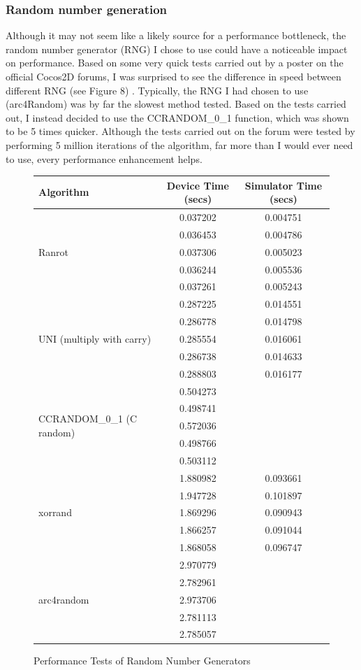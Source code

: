 \documentclass[a4paper,oneside]{report}
\begin{document}
\subsubsection{Random number generation} 

Although it may not seem like a likely source for a performance bottleneck, the random number generator (RNG) I chose to use could have a noticeable impact on performance. Based on some very quick tests carried out by a poster on the official Cocos2D forums, I was surprised to see the difference in speed between different RNG (see Figure 8) \cite{:2011zt}. Typically, the RNG I had chosen to use (arc4Random) was by far the slowest method tested. Based on the tests carried out, I instead decided to use the CCRANDOM\_0\_1 function, which was shown to be 5 times quicker. Although the tests carried out on the forum were tested by performing 5 million iterations of the algorithm, far more than I would ever need to use, every performance enhancement helps.
	
\begin{figure}[h!]
  \centering	
	\begin{tabular}{|l|c|c|}
\hline
Algorithm & Device Time (secs) & Simulator Time (secs)\\ \hline
\multirow{5}{*}{Ranrot} & 0.037202 & 0.004751 \\
 & 0.036453 & 0.004786 \\
 & 0.037306 & 0.005023 \\
 & 0.036244 & 0.005536 \\ 
 & 0.037261 & 0.005243 \\ \hline
\multirow{5}{*}{UNI (multiply with carry)} & 0.287225 & 0.014551 \\
 & 0.286778 & 0.014798 \\
 & 0.285554 & 0.016061 \\
 & 0.286738 & 0.014633 \\
 & 0.288803 & 0.016177 \\ \hline
\multirow{5}{*}{CCRANDOM\_0\_1 (C random)} & 0.504273 &  \\
 & 0.498741 &  \\
 & 0.572036 &  \\
 & 0.498766 &  \\
 & 0.503112 &  \\ \hline
\multirow{5}{*}{xorrand} & 1.880982 & 0.093661 \\
 & 1.947728 & 0.101897 \\
 & 1.869296 & 0.090943 \\
 & 1.866257 & 0.091044 \\
 & 1.868058 & 0.096747 \\ \hline
\multirow{5}{*}{arc4random} & 2.970779 &  \\
 & 2.782961 &  \\
 & 2.973706 &  \\
 & 2.781113 &  \\
 & 2.785057 &  \\ \hline
\end{tabular}    \caption{Performance Tests of Random Number Generators}
\end{figure}
\end{document}
